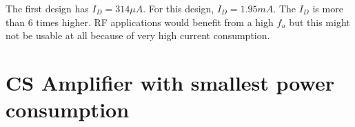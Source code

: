 \documentclass[conference]{IEEEtran}
\begin{document}
\vspace{8pt}
The first design has $I_D = 314\mu A$. For this design, $I_D=1.95mA$. The $I_D$ is more than 6 times higher. RF applications would benefit from a high $f_u$ but this might not be usable at all because of very high current consumption. 

\vspace{8pt}
\section{CS Amplifier with smallest power consumption}
\end{document}
